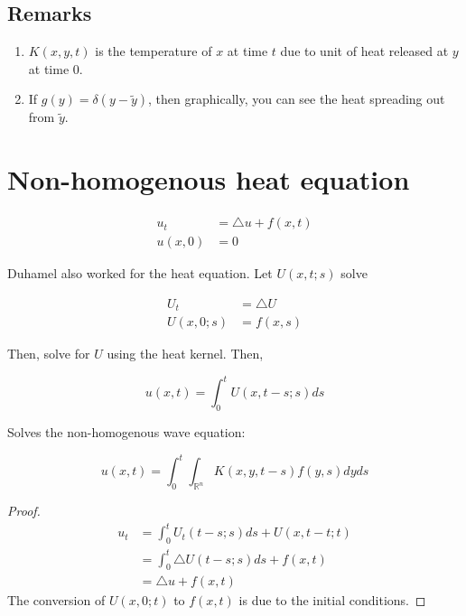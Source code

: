 \documentclass{article}
\newtheorem{one minute paper}[theorem]{One Minute Paper}
\begin{document}
\subsection*{Remarks}

\begin{enumerate}
    \item $K(x,y,t)$ is the temperature of $x$ at time $t$ due to unit of heat released at $y$ at time $0$. 
    \item If $g(y) = \delta(y - \tilde{y})$, then graphically, you can see the heat spreading out from $\tilde{y}$. 
\end{enumerate}

\section*{Non-homogenous heat equation}

\begin{align*}
    u_t &= \triangle u + f(x,t)\\
    u(x,0) &= 0
\end{align*}

Duhamel also worked for the heat equation. Let $U(x,t;s)$ solve 

\begin{align*}
    U_t &= \triangle U \\
    U(x,0;s) &= f(x,s)
\end{align*}

Then, solve for $U$ using the heat kernel. Then, 

\begin{equation}
    u(x,t) = \int_{0}^{t}U(x,t-s;s) ds
\end{equation}

Solves the non-homogenous wave equation:

\begin{equation}
    u(x,t) = \int_{0}^{t}\int_{\mathbb{R}^n}K(x,y,t-s)f(y,s)dyds
\end{equation}

\begin{proof}
    \begin{align*}
        u_t &= \int_{0}^{t}U_t(t - s; s) ds + U(x,t-t;t) \\
        &= \int_{0}^{t} \triangle U(t-s;s)ds + f(x,t)\\
        &= \triangle u + f(x,t)
    \end{align*}
    The conversion of $U(x,0;t)$ to $f(x,t)$ is due to the initial conditions.
\end{proof}
\end{document}
